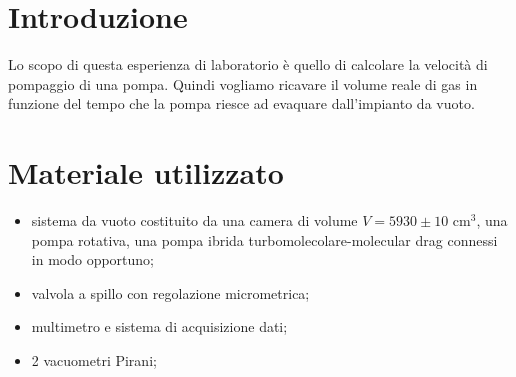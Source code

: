 \section{Introduzione}

Lo scopo di questa esperienza di laboratorio è quello di calcolare la velocità di pompaggio di una pompa. Quindi vogliamo ricavare il volume reale di gas in funzione del tempo che la pompa riesce ad evaquare dall'impianto da vuoto.

\section{Materiale utilizzato}

\begin{itemize}
	\item{sistema da vuoto costituito da una camera di volume $V = 5930 \pm 10$ \si{\centi\metre}$^3$, una pompa rotativa, una pompa ibrida turbomolecolare-molecular drag connessi in modo opportuno;}
	\item{valvola a spillo con regolazione micrometrica;}
	\item{multimetro e sistema di acquisizione dati;}
	\item{2 vacuometri Pirani;}
\end{itemize}
